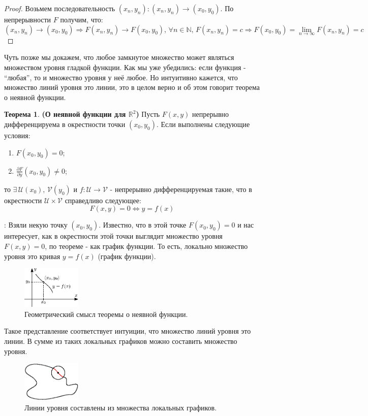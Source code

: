 \documentclass[12pt]{article}
\newcommand{\MR}{\mathbb{R}}
\newcommand{\MN}{\mathbb{N}}
\newcommand{\MU}{\mathcal{U}}
\newcommand{\MV}{\mathcal{V}}
\theoremstyle{definition}
\newtheorem{theorem}{Теорема}
\begin{document}
\begin{proof}
	Возьмем последовательность $(x_n,y_n) \colon (x_n, y_n) \to (x_0, y_0)$. По непрерывности $F$ получим, что:
	$$
		(x_n, y_n) \to (x_0, y_0) \Rightarrow F(x_n, y_n) \to F(x_0,y_0), \, \forall n \in \MN, \, F(x_n,y_n) = c \Rightarrow F(x_0, y_0) = \lim\limits_{n \to \infty}F(x_n,y_n) = c
	$$
\end{proof}
Чуть позже мы докажем, что любое замкнутое множество может являться множеством уровня гладкой функции. Как мы уже убедились: если функция - ``любая'', то и множество уровня у неё любое. Но интуитивно кажется, что множество линий уровня это линии, это в целом верно и об этом говорит теорема о неявной функции.
\begin{theorem}\textbf{(О неявной функции для $\MR^2$)} 
	Пусть $F(x,y)$ непрерывно дифференцируема в окрестности точки $(x_0, y_0)$. Если выполнены следующие условия:
	\begin{enumerate}[label ={\arabic*)}]
		\item $F(x_0,y_0) = 0$;
		\item $\tfrac{\partial F}{\partial y}(x_0,y_0) \neq 0$;
	\end{enumerate}
	то $\exists \, \MU(x_0),\, \MV(y_0)$ и $f \colon \MU \to \MV$ - непрерывно дифференцируемая такие, что в окрестности $\MU \times \MV$ справедливо следующее:
	$$
		F(x,y) = 0 \Leftrightarrow y = f(x)
	$$
\end{theorem}
\textbf{}: Взяли некую точку $(x_0, y_0)$. Известно, что в этой точке $F(x_0,y_0) = 0$ и нас интересует, как в окрестности этой точки выглядит множество уровня $F(x,y) = 0$, по теореме - как график функции. То есть, локально множество уровня это кривая $y =f(x)$ (график функции). 
\begin{figure}[H]
	\centering
	\includegraphics[width=0.25\textwidth]{15_5.eps}
	\caption{Геометрический смысл теоремы о неявной функции.}
	\label{15_5}
\end{figure}
Такое представление соответствует интуиции, что множество линий уровня это линии. В сумме из таких локальных графиков можно составить множество уровня. 
\begin{figure}[H]
	\centering
	\includegraphics[width=0.25\textwidth]{15_6.eps}
	\caption{Линии уровня составлены из множества локальных графиков.}
	\label{15_6}
\end{figure}
\end{document}
